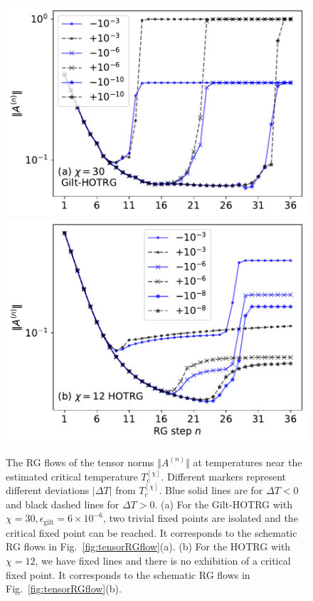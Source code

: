 \documentclass[aps,prb,reprint,superscriptaddress]{revtex4-2}
\begin{document}
\begin{figure}[htb]
    \includegraphics[width=\columnwidth]{./figures/AnormFlow-a.pdf}
    \includegraphics[width=\columnwidth]{./figures/AnormFlow-b.pdf}
    \caption{\label{fig:flowAnorm}The RG flows of the tensor norms $\Vert
    A^{(n)} \Vert$ at temperatures near the estimated critical
temperature $T_c^{[\chi]}$. Different markers represent different
deviations $| \Delta T| $ from $T_c^{[\chi]}$. Blue solid lines are for
$\Delta T<0$ and black dashed lines for $\Delta T>0$. (a) For the
Gilt-HOTRG with $\chi = 30,\epsilon_{\text{gilt}} = 6\times 10^{-6}$,
two trivial fixed points are isolated and the critical fixed point can
be reached. It corresponds to the schematic RG flows in
Fig.~\ref{fig:tensorRGflow}(a). (b) For the HOTRG with $\chi = 12$, we
have fixed lines and there is no exhibition of a critical fixed point.
It corresponds to the schematic RG flows in
Fig.~\ref{fig:tensorRGflow}(b).}
\end{figure}
%
\end{document}
